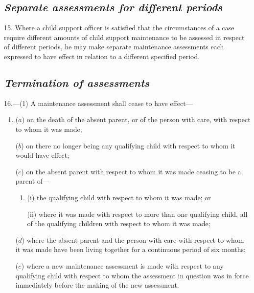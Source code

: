 \documentclass[12pt,a4paper]{article}
\begin{document}

\subsection*{\itshape Separate assessments for different periods}

15. Where 
a child support officer 
is satisfied that the circumstances of a case require different amounts of child support maintenance to be assessed in respect of different periods, he may make separate maintenance assessments each expressed to have effect in relation to a different specified period.


\subsection*{\itshape Termination of assessments}

16.---(1) A maintenance assessment shall cease to have effect—
\begin{enumerate}\item[]
($a$) on the death of the absent parent, or of the person with care, with respect to whom it was made;

($b$) on there no longer being any qualifying child with respect to whom it would have effect;

($c$) on the absent parent with respect to whom it was made ceasing to be a parent of—
\begin{enumerate}\item[]
(i) the qualifying child with respect to whom it was made; or

(ii) where it was made with respect to more than one qualifying child, all of the qualifying children with respect to whom it was made;
\end{enumerate}

($d$) where the absent parent and the person with care with respect to whom it was made have been living together for a continuous period of six months;

($e$) where a new maintenance assessment is made with respect to any qualifying child with respect to whom the assessment in question was in force immediately before the making of the new assessment.
\end{enumerate}
\end{document}
